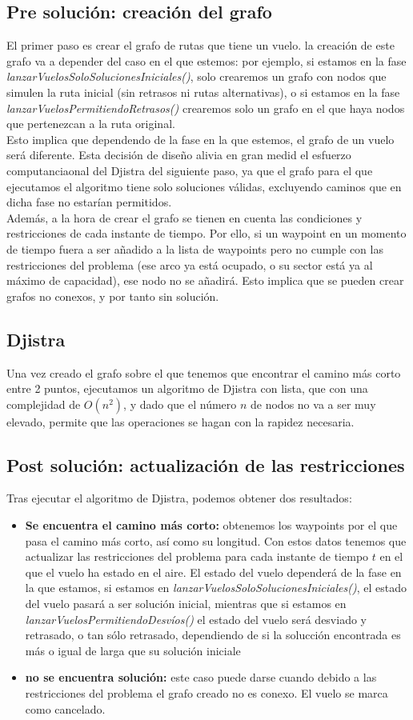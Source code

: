 \subsection{Pre solución: creación del grafo}
El primer paso es crear el grafo de rutas que tiene un vuelo. la creación de este grafo  va a depender del caso en el que estemos: por ejemplo, si estamos en la fase \textit{lanzarVuelosSoloSolucionesIniciales()}, solo crearemos un grafo con nodos que simulen la ruta inicial (sin retrasos ni rutas alternativas), o si estamos en la fase \textit{lanzarVuelosPermitiendoRetrasos()} crearemos solo un grafo en el que haya nodos  que pertenezcan a la ruta original.\\
Esto implica que dependendo de la fase en la que estemos, el grafo de un vuelo será diferente. Esta decisión de diseño alivia en gran medid el esfuerzo computanciaonal del Djistra del siguiente paso, ya que el grafo para el que ejecutamos el algoritmo tiene solo soluciones válidas, excluyendo caminos que en dicha fase no estarían permitidos.\\
Además, a la hora de crear el grafo se tienen en cuenta las condiciones y restricciones de cada instante de tiempo. Por ello, si un waypoint en un momento de tiempo fuera a ser añadido a la lista de waypoints pero no cumple con las restricciones del problema (ese arco ya está ocupado, o su sector está ya al máximo de capacidad), ese nodo no se añadirá. Esto implica que se pueden crear grafos no conexos, y por tanto sin solución.
\subsection{Djistra}
Una vez creado el grafo sobre el que tenemos que encontrar el camino más corto entre 2 puntos, ejecutamos un algoritmo de Djistra con lista, que con una complejidad de $O(n^{2})$, y dado que el número $n$ de nodos no va a ser muy elevado, permite que las operaciones se hagan con la rapidez necesaria.
\subsection{Post solución: actualización de las restricciones}
Tras ejecutar el algoritmo de Djistra, podemos obtener dos resultados:
\begin{itemize}
	\item \textbf{Se encuentra el camino más corto:} obtenemos los waypoints por el que pasa el camino más corto, así como su longitud. Con estos datos tenemos que actualizar las restricciones del problema para cada instante de tiempo $t$ en el que el vuelo ha estado en el aire. El estado del vuelo dependerá de la fase en la que estamos, si estamos en \textit{lanzarVuelosSoloSolucionesIniciales()}, el estado del vuelo pasará a ser solución inicial, mientras que si estamos en \textit{lanzarVuelosPermitiendoDesvíos()} el estado del vuelo será desviado y retrasado, o tan sólo retrasado, dependiendo de si la solucción encontrada es más o igual de larga que su solución iniciale
	\item \textbf{no se encuentra solución:} este caso puede darse cuando debido a las restricciones del problema el grafo creado no es conexo. El vuelo se marca como cancelado.
\end{itemize}
